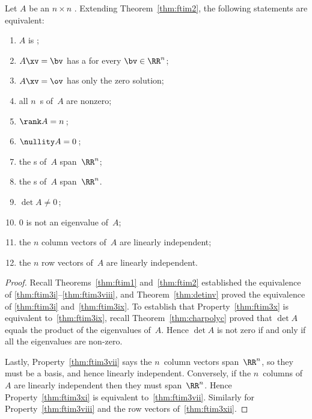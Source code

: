 \begin{theorem} \label{thm:ftim3} 
Let \(A\) be an \(n\times n\) .  
Extending Theorem~\ref{thm:ftim2}, the following statements are equivalent:
\begin{enumerate}
\item\label{thm:ftim3i} \(A\) is ;
\item\label{thm:ftim3ii} \(A\xv=\bv\) has a  for every \(\bv\in\RR^n\);
\item\label{thm:ftim3iii} \(A\xv=\ov\) has only the zero solution;
\item\label{thm:ftim3iv} all \(n\)~s of~\(A\) are nonzero;
\item\label{thm:ftim3v} \(\rank A=n\)\,;
\item\label{thm:ftim3vi} \(\nullity A=0\)\,;
\item\label{thm:ftim3vii} the s of~\(A\) span~\(\RR^n\);
\item\label{thm:ftim3viii} the s of~\(A\) span~\(\RR^n\).
\item\label{thm:ftim3ix} \(\det A\neq 0\)\,;
\item\label{thm:ftim3x} \(0\) is not an eigenvalue of~\(A\);
\item\label{thm:ftim3xi} the \(n\) column vectors of~\(A\) are linearly independent;
\item\label{thm:ftim3xii} the \(n\) row vectors of~\(A\) are linearly independent.
\end{enumerate}
\end{theorem}
\begin{proof} 
Recall Theorems~\ref{thm:ftim1} and~\ref{thm:ftim2} established the equivalence of \ref{thm:ftim3i}--\ref{thm:ftim3viii}, and Theorem~\ref{thm:detinv} proved the equivalence of \ref{thm:ftim3i} and~\ref{thm:ftim3ix}.
To establish that Property~\ref{thm:ftim3x} is equivalent to~\ref{thm:ftim3ix}, recall Theorem~\ref{thm:charpolyc} proved that \(\det A\) equals the product of the eigenvalues of~\(A\). 
Hence  \(\det A\) is not zero if and only if all the eigenvalues are non-zero.  

Lastly, Property~\ref{thm:ftim3vii} says the \(n\)~column vectors span~\(\RR^n\), so they must be a basis, and hence linearly independent.
Conversely, if the \(n\)~columns of~\(A\) are linearly independent then they must span~\(\RR^n\).  
Hence Property~\ref{thm:ftim3xi} is equivalent to~\ref{thm:ftim3vii}.
Similarly  for Property~\ref{thm:ftim3viii} and the row vectors of~\ref{thm:ftim3xii}.
\end{proof}









